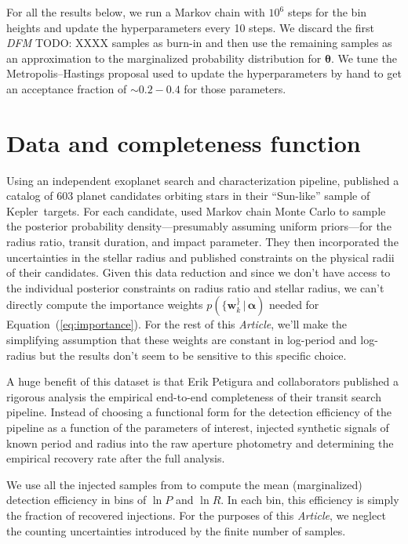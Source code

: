 \documentclass[12pt,preprint]{aastex}
\newcommand{\project}[1]{{\sffamily #1}}
\newcommand{\kepler}{\project{Kepler}}
\newcommand{\paper}{\textsl{Article}}
\newcommand{\Eq}[1]{Equation~(\ref{eq:#1})}
\newcommand{\eq}[1]{\Eq{#1}}
\newcommand{\sectlabel}[1]{\label{sect:#1}}
\newcommand{\bvec}[1]{\ensuremath{\boldsymbol{#1}}}
\newcommand{\todo}[3]{{\color{#2} \emph{#1} TODO: #3}}
\newcommand{\dfmtodo}[1]{\todo{DFM}{red}{#1}}
\newcommand{\ratepar}{{\ensuremath{\theta}}}
\newcommand{\ratepars}{{\ensuremath{\bvec{\ratepar}}}}
\newcommand{\radius}{\ensuremath{R}}
\newcommand{\period}{\ensuremath{P}}
\newcommand{\entry}{{\ensuremath{\bvec{w}}}}
\newcommand{\interim}{{\ensuremath{\bvec{\alpha}}}}
\begin{document}
For all the results below, we run a Markov chain with $10^6$ steps for the bin
heights and update the hyperparameters every 10 steps.
We discard the first \dfmtodo{XXXX} samples as burn-in and then use the
remaining samples as an approximation to the marginalized probability
distribution for \ratepars.
We tune the Metropolis--Hastings proposal used to update the hyperparameters
by hand to get an acceptance fraction of $\sim0.2-0.4$ for those parameters.

\section{Data and completeness function}
\sectlabel{data}

Using an independent exoplanet search and characterization pipeline,
\citet{petigura} published a catalog of 603 planet candidates orbiting stars
in their ``Sun-like'' sample of \kepler\ targets.
For each candidate, \citet{petigura} used Markov chain Monte Carlo to sample
the posterior probability density---presumably assuming uniform priors---for
the radius ratio, transit duration, and impact parameter.
They then incorporated the uncertainties in the stellar radius and published
constraints on the physical radii of their candidates.
Given this data reduction and since we don't have access to the individual
posterior constraints on radius ratio and stellar radius, we can't directly
compute the importance weights $p(\{\entry_k^\}\,|\,\interim)$ needed for
\eq{importance}.
For the rest of this \paper, we'll make the simplifying assumption that these
weights are constant in log-period and log-radius but the results don't seem
to be sensitive to this specific choice.

A huge benefit of this dataset is that Erik Petigura and collaborators
published a rigorous analysis the empirical end-to-end completeness of their
transit search pipeline.
Instead of choosing a functional form for the detection efficiency of the
pipeline as a function of the parameters of interest, \citet{petigura}
injected synthetic signals of known period and radius into the raw aperture
photometry and determining the empirical recovery rate after the full analysis.

We use all the injected samples from \citet{petigura} to compute the mean
(marginalized) detection efficiency in bins of $\ln\period$ and $\ln\radius$.
In each bin, this efficiency is simply the fraction of recovered injections.
For the purposes of this \paper, we neglect the counting uncertainties
introduced by the finite number of samples.
\end{document}
